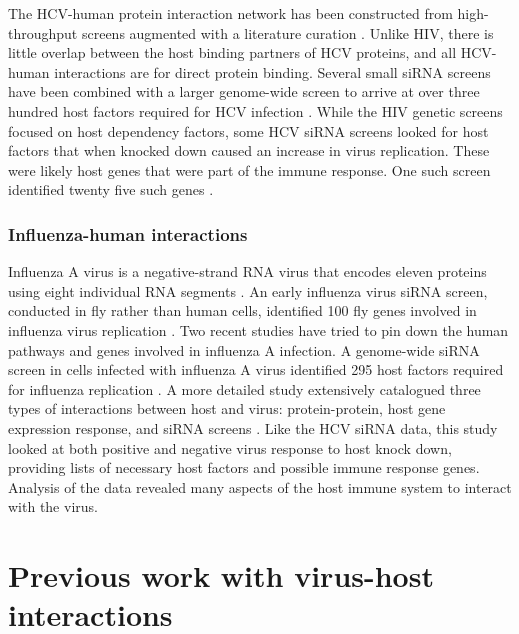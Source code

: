 The HCV-human protein interaction network has been constructed from
high-throughput screens augmented with a literature curation
\cite{dechassey08}. Unlike HIV, there is little overlap between the
host binding partners of HCV proteins, and all HCV-human interactions
are for direct protein binding. Several small siRNA screens have been
combined with a larger genome-wide screen to arrive at over three
hundred host factors required for HCV infection \cite{Li09}. While the
HIV genetic screens focused on host dependency factors, some HCV siRNA
screens looked for host factors that when knocked down caused an
increase in virus replication. These were likely host genes that were
part of the immune response. One such screen identified twenty five
such genes \cite{Li09}.

\subsubsection{Influenza-human interactions}

Influenza A virus is a negative-strand RNA virus that encodes eleven
proteins using eight individual RNA segments
\cite{clancy2008genetics}.  An early influenza virus siRNA screen,
conducted in fly rather than human cells, identified 100 fly genes
involved in influenza virus replication \cite{hao2008drosophila}. Two
recent studies have tried to pin down the human pathways and genes
involved in influenza A infection. A genome-wide siRNA screen in cells
infected with influenza A virus identified 295 host factors required
for influenza replication \cite{konig2009human}. A more detailed study
extensively catalogued three types of interactions between host and
virus: protein-protein, host gene expression response, and siRNA
screens \cite{shapira2009physical}. Like the HCV siRNA data, this
study looked at both positive and negative virus response to host
knock down, providing lists of necessary host factors and possible
immune response genes. Analysis of the data revealed many aspects of
the host immune system to interact with the virus.

\section{Previous work with virus-host interactions}

